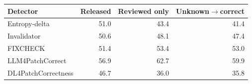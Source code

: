 \begin{tabular}{lrrr}
\toprule
Detector & Released & Reviewed only & Unknown$\rightarrow$correct \\
\midrule
Entropy-delta & 51.0 & 43.4 & 41.4 \\
Invalidator & 50.6 & 48.1 & 47.4 \\
FIXCHECK & 51.4 & 53.4 & 53.0 \\
LLM4PatchCorrect & 56.9 & 62.7 & 59.9 \\
DL4PatchCorrectness & 46.7 & 36.0 & 35.8 \\
\bottomrule
\end{tabular}
